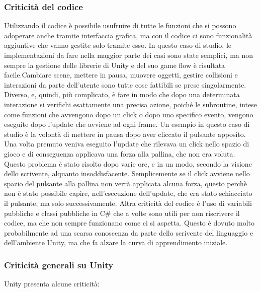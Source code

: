 \subsubsection{Criticità del codice}
Utilizzando il codice è possibile usufruire di tutte le funzioni che si possono adoperare anche tramite interfaccia grafica, ma con il codice ci sono funzionalità aggiuntive che vanno gestite solo tramite esso. In questo caso di studio, le implementazioni da fare nella maggior parte dei casi sono state semplici, ma non sempre la gestione delle librerie di Unity e del suo game flow è risultata facile.Cambiare scene, mettere in pausa, muovere oggetti, gestire collisioni e interazioni da parte dell’utente sono tutte cose fattibili se prese singolarmente. Diverso, e, quindi, più complicato, è fare in modo che dopo una determinata interazione si verifichi esattamente una precisa azione, poiché le subroutine, intese come funzioni che avvengono dopo un click o dopo uno specifico evento, vengono eseguite dopo l’update che avviene ad ogni frame. 
Un esempio in questo caso di studio è la volontà di mettere in pausa dopo aver cliccato il pulsante apposito. Una volta premuto veniva eseguito l’update che rilevava un click nello spazio di gioco e di conseguenza applicava una forza alla pallina, che non era voluta. Questo problema è stato risolto dopo varie ore, e in un modo, secondo la visione dello scrivente, alquanto insoddisfacente. Semplicemente se il click avviene nello spazio del pulsante alla pallina non verrà applicata alcuna forza, questo perchè non è stato possibile capire, nell’esecuzione dell’update, che era stato schiacciato il pulsante, ma solo successivamente. Altra criticità del codice è l’uso di variabili pubbliche e classi pubbliche in C\# che a volte sono utili per non riscrivere il codice, ma che non sempre funzionano come ci si aspetta. Questo è dovuto molto probabilmente ad una scarsa conoscenza da parte dello scrivente del linguaggio e dell’ambiente Unity, ma che fa alzare la curva di apprendimento iniziale.


\subsubsection{Criticità generali su Unity}
Unity presenta alcune criticità:

